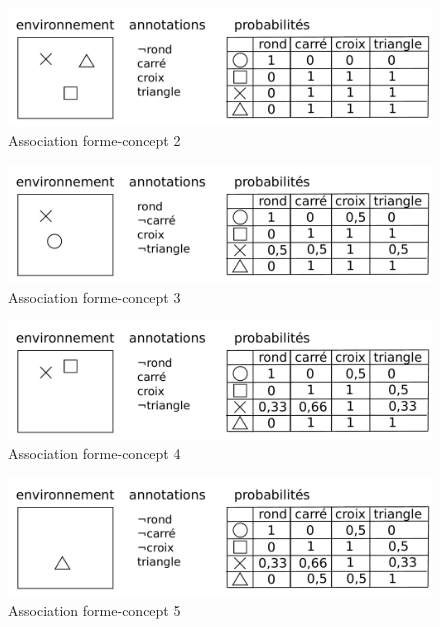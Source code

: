 \begin{figure}[H] 
\includegraphics[width=\textwidth]{files/raisonneur/annotations_2} 
\caption{Association forme-concept 2} 
\label{img_annotations_2}
\end{figure}

\begin{figure}[H] 
\includegraphics[width=\textwidth]{files/raisonneur/annotations_3} 
\caption{Association forme-concept 3} 
\label{img_annotations_3}
\end{figure}

\begin{figure}[H] 
\includegraphics[width=\textwidth]{files/raisonneur/annotations_4} 
\caption{Association forme-concept 4} 
\label{img_annotations_4}
\end{figure}

\begin{figure}[H] 
\includegraphics[width=\textwidth]{files/raisonneur/annotations_5} 
\caption{Association forme-concept 5} 
\label{img_annotations_5}
\end{figure}



